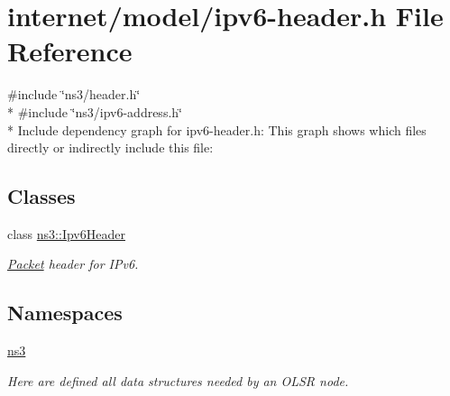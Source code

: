 \hypertarget{ipv6-header_8h}{}\section{internet/model/ipv6-\/header.h File Reference}
\label{ipv6-header_8h}
{\ttfamily \#include \char`\"{}ns3/header.\+h\char`\"{}}\\*
{\ttfamily \#include \char`\"{}ns3/ipv6-\/address.\+h\char`\"{}}\\*
Include dependency graph for ipv6-\/header.h\+:
This graph shows which files directly or indirectly include this file\+:
\subsection*{Classes}
\begin{DoxyCompactItemize}
\item 
class \hyperlink{classns3_1_1Ipv6Header}{ns3\+::\+Ipv6\+Header}
\begin{DoxyCompactList}\small\item\em \hyperlink{classns3_1_1Packet}{Packet} header for I\+Pv6. \end{DoxyCompactList}\end{DoxyCompactItemize}
\subsection*{Namespaces}
\begin{DoxyCompactItemize}
\item 
 \hyperlink{namespacens3}{ns3}
\begin{DoxyCompactList}\small\item\em Here are defined all data structures needed by an O\+L\+SR node. \end{DoxyCompactList}\end{DoxyCompactItemize}
